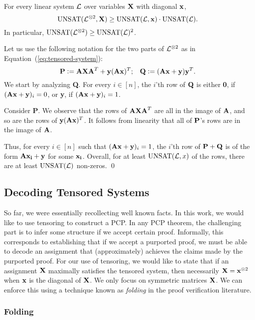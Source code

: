 \begin{lemma}\label{converse} For every linear system ${\cal L}$ over variables ${\bf X}$ with diagonal ${\bf x}$,
$$\mbox{UNSAT}({\cal L}^{\otimes 2},{\bf X}) \geq \mbox{UNSAT}({\cal L}, {\bf x})\cdot \mbox{UNSAT}({\cal L}).$$
In particular, $\mbox{UNSAT}({\cal L}^{\otimes 2}) \geq \mbox{UNSAT}({\cal L})^2$.
\end{lemma}
Let us use the following notation for the two parts of ${\cal L}^{\otimes
  2}$ as in Equation~(\ref{eq:tensored-system}):
$${\bf P}:= {\bf AXA}^T + {\bf y}({\bf Ax})^T;\;\;\; {\bf Q}:= ({\bf Ax} + {\bf y}){\bf y}^T.$$
We start by analyzing {\bf Q}. For every $i\in [n]$, the $i$'th row of
${\bf Q}$ is either {\bf 0}, if $({\bf Ax} + {\bf y})_i = 0$, or {\bf
  y}, if $({\bf Ax} + {\bf y})_i =1$.

Consider {\bf P}. We observe that the rows of ${\bf AXA}^T$ are all in
the image of ${\bf A}$, and so are the rows of ${\bf y}({\bf
  Ax})^T$. It follows from linearity that all of ${\bf P}$'s rows are
in the image of ${\bf A}$.

Thus, for every $i\in [n]$ such that $({\bf Ax} + {\bf y})_i =1$, the
$i$'th row of ${\bf P + Q}$ is of the form ${\bf A x_i} + {\bf y}$ for
some ${\bf x_i}$.  Overall, for at least $\mbox{UNSAT}({\cal L},x)$ of the
rows, there are at least $\mbox{UNSAT}({\cal L})$ non-zeros. \qed 


\subsection{Decoding Tensored Systems}

So far, we were essentially recollecting well known facts. In this
work, we would like to use tensoring to construct a PCP. In any PCP
theorem, the challenging part is to infer some structure if we accept
certain proof. Informally, this corresponds to establishing that if we
accept a purported proof, we must be able to decode an assignment that
(approximately) achieves the claims made by the purported proof. For
our use of tensoring, we would like to state that if an assignment
${\bf X}$ maximally satisfies the tensored system, then necessarily
${\bf X} = {\bf x}^{\otimes 2}$ when ${\bf x}$ is the diagonal of
${\bf X}$. We only focus on symmetric matrices ${\bf X}$. We can
enforce this using a technique known as {\em folding} in the proof
verification literature.

\subsubsection{Folding} 

